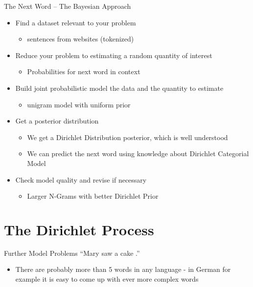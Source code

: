 \documentclass[11pt]{beamer}
\begin{document}
	\begin{frame}{The Next Word -- The Bayesian Approach}
		\centering
		\begin{itemize}
			\item Find a dataset relevant to your problem
			\begin{itemize}
				\item sentences from websites (tokenized) \checkmark
			\end{itemize}
			\item Reduce your problem to estimating a random quantity of interest
			\begin{itemize}
				\item Probabilities for next word in context \checkmark 
			\end{itemize}
			\item Build joint probabilistic model the data and the quantity to estimate
			\begin{itemize}
				\item unigram model with uniform prior \checkmark
			\end{itemize}
			\item Get a posterior distribution
			\begin{itemize}
				\item We get a Dirichlet Distribution posterior, which is well understood \checkmark
				\item We can predict the next word using knowledge about Dirichlet Categorial Model \checkmark
			\end{itemize}
			\item Check model quality and revise if necessary
			\begin{itemize}
				\item Larger N-Grams with better Dirichlet Prior \checkmark
			\end{itemize}
		\end{itemize}
	\end{frame}
	
	\section{The Dirichlet Process}
	
	\begin{frame}{Further Model Problems}
		``Mary saw a cake .''
		
		\vspace{10pt}\begin{itemize}
			\item There are probably more than 5 words in any language - in German for example it is easy to come up with ever more complex words
		\end{itemize}
	\end{frame}
	
\end{document}

